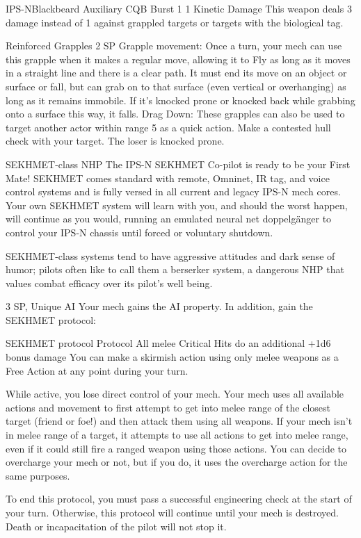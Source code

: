 \begin{mech}{IPS-N}{Blackbeard}
Auxiliary CQB
Burst 1
1 Kinetic Damage
This weapon deals 3 damage instead of 1 against grappled targets or targets with the biological tag.

Reinforced Grapples
2 SP
Grapple movement: Once a turn, your mech can use this grapple when it makes a regular move, allowing it to Fly as long as it moves in a straight line and there is a clear path. It must end its move on an object or surface or fall, but can grab on to that surface (even vertical or overhanging) as long as it remains immobile. If it’s knocked prone or knocked back while grabbing onto a surface this way, it falls.
Drag Down: These grapples can also be used to target another actor within range 5 as a quick action. Make a contested hull check with your target. The loser is knocked prone.

SEKHMET-class NHP
The IPS-N SEKHMET Co-pilot is ready to be your First Mate! SEKHMET comes standard with remote, Omninet, IR tag, and voice control systems and is fully versed in all current and legacy IPS-N mech cores. Your own SEKHMET system will learn with you, and should the worst happen, will continue as you would, running an emulated neural net doppelgänger to control your IPS-N chassis until forced or voluntary shutdown.

SEKHMET-class systems tend to have aggressive attitudes and dark sense of humor; pilots often like to call them a berserker system, a dangerous NHP that values combat efficacy over its pilot’s well being.

3 SP, Unique
AI
Your mech gains the AI property. In addition, gain the SEKHMET protocol:

SEKHMET protocol
Protocol
All melee Critical Hits do an additional +1d6 bonus damage
You can make a skirmish action using only melee weapons as a Free Action at any point during your turn.

While active, you lose direct control of your mech. Your mech uses all available actions and movement to first attempt to get into melee range of the closest target (friend or foe!) and then attack them using all weapons. If your mech isn’t in melee range of a target, it attempts to use all actions to get into melee range, even if it could still fire a ranged weapon using those actions. You can decide to overcharge your mech or not, but if you do, it uses the overcharge action for the same purposes.

To end this protocol, you must pass a successful engineering check at the start of your turn. Otherwise, this protocol will continue until your mech is destroyed. Death or incapacitation of the pilot will not stop it.


\end{mech}
